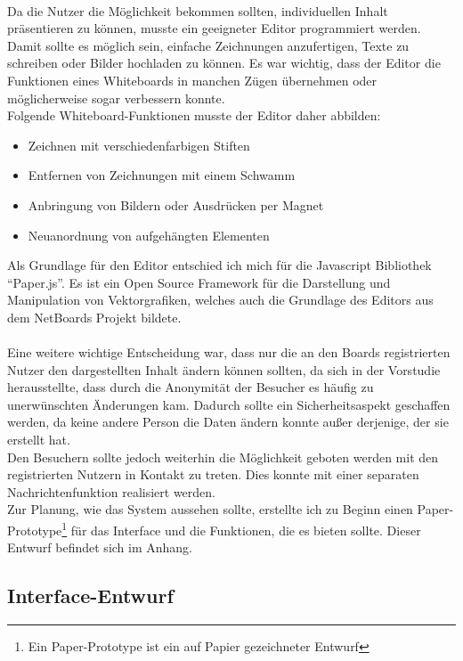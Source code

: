 \\
Da die Nutzer die Möglichkeit bekommen sollten, individuellen Inhalt präsentieren zu können, musste ein geeigneter Editor programmiert werden.
Damit sollte es möglich sein, einfache Zeichnungen anzufertigen, Texte zu schreiben oder Bilder hochladen zu können.
Es war wichtig, dass der Editor die Funktionen eines Whiteboards in manchen Zügen übernehmen oder möglicherweise sogar verbessern konnte.
\\
Folgende Whiteboard-Funktionen musste der Editor daher abbilden:
\begin{itemize}
  \item Zeichnen mit verschiedenfarbigen Stiften
  \item Entfernen von Zeichnungen mit einem Schwamm
  \item Anbringung von Bildern oder Ausdrücken per Magnet
  \item Neuanordnung von aufgehängten Elementen
\end{itemize}
Als Grundlage für den Editor entschied ich mich für die Javascript Bibliothek ``Paper.js''\cite{paperjs:website}.
Es ist ein Open Source Framework für die Darstellung und Manipulation von Vektorgrafiken, welches auch die Grundlage des Editors aus dem NetBoards Projekt bildete\cite{wood:2014}.
\\
\\
Eine weitere wichtige Entscheidung war, dass nur die an den Boards registrierten Nutzer den dargestellten Inhalt ändern können sollten, da sich in der Vorstudie herausstellte, dass durch die Anonymität der Besucher es häufig zu unerwünschten Änderungen kam.
Dadurch sollte ein Sicherheitsaspekt geschaffen werden, da keine andere Person die Daten ändern konnte außer derjenige, der sie erstellt hat.
\\
Den Besuchern sollte jedoch weiterhin die Möglichkeit geboten werden mit den registrierten Nutzern in Kontakt zu treten. Dies konnte mit einer separaten Nachrichtenfunktion realisiert werden.
\\
Zur Planung, wie das System aussehen sollte, erstellte ich zu Beginn einen Paper-Prototype\footnote{Ein Paper-Prototype ist ein auf Papier gezeichneter Entwurf} für das Interface und die Funktionen, die es bieten sollte. Dieser Entwurf befindet sich im Anhang.










\subsection{Interface-Entwurf}\label{Interface-Entwurf}
